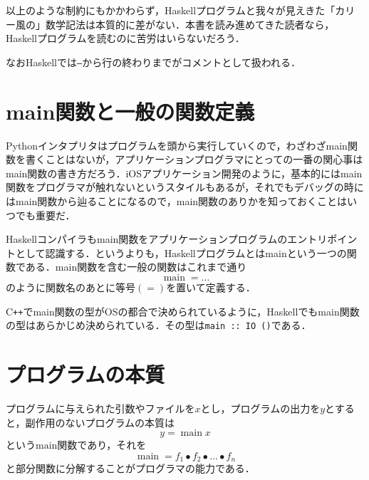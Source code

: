 \documentclass[a5paper,draft]{jsbook}
\newcommand{\programminglanguage}[1]{\textsf{#1}}
\newcommand{\cxx}{\programminglanguage{C}\texttt{++}}
\newcommand{\haskell}{\programminglanguage{Haskell}}
\newcommand{\python}{\programminglanguage{Python}}
\newcommand{\code}[1]{\texttt{#1}}
\DeclareMathOperator{\mathMain}{main}
\newcommand{\mathCompose}{\mathbin{\bullet}}
\begin{document}
以上のような制約にもかかわらず，\haskell プログラムと我々が見えきた「カリー風の」数学記法は本質的に差がない．本書を読み進めてきた読者なら，\haskell プログラムを読むのに苦労はいらないだろう．

なお\haskell では\code{--}から行の終わりまでがコメントとして扱われる．

\section{main関数と一般の関数定義}

\python インタプリタはプログラムを頭から実行していくので，わざわざmain関数を書くことはないが，アプリケーションプログラマにとっての一番の関心事はmain関数の書き方だろう．iOSアプリケーション開発のように，基本的にはmain関数をプログラマが触れないというスタイルもあるが，それでもデバッグの時にはmain関数から辿ることになるので，main関数のありかを知っておくことはいつでも重要だ．

\haskell コンパイラもmain関数をアプリケーションプログラムのエントリポイントとして認識する．というよりも，\haskell プログラムとはmainという一つの関数である．main関数を含む一般の関数はこれまで通り
\begin{equation}
\mathMain=\dots
\end{equation}
のように関数名のあとに等号$(=)$を置いて定義する．

\cxx でmain関数の型がOSの都合で決められているように，\haskell でもmain関数の型はあらかじめ決められている．その型は\code{main :: IO ()}である．


\section{プログラムの本質}

プログラムに与えられた引数やファイルを$x$とし，プログラムの出力を$y$とすると，副作用のないプログラムの本質は
\begin{equation}
y=\mathMain x
\end{equation}
という$\text{main}$関数であり，それを
\begin{equation}
\mathMain=f_1\mathCompose f_2\mathCompose\dots\mathCompose f_n
\end{equation}
と部分関数に分解することがプログラマの能力である．
\end{document}
